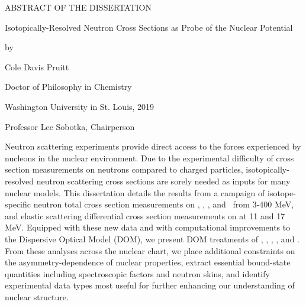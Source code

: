\thispagestyle{plain}
\begin{center}

    ABSTRACT OF THE DISSERTATION

    Isotopically-Resolved Neutron Cross Sections as Probe of the Nuclear
    Potential

    \vspace{0.5 cm}

    by

    \vspace{0.2 cm}

    Cole Davis Pruitt

    \vspace{0.2 cm}

    Doctor of Philosophy in Chemistry

    \vspace{0.2 cm}

    Washington University in St. Louis, 2019

    \vspace{0.2cm}

    Professor Lee Sobotka, Chairperson
\end{center}

\vspace{1cm}

Neutron scattering experiments provide direct access to the forces experienced by nucleons in the
nuclear environment. Due to the experimental difficulty of cross section measurements on neutrons compared to charged particles,
isotopically-resolved neutron scattering cross sections are sorely needed as inputs for many nuclear models.
This dissertation details the results from a campaign of
isotope-specific neutron total cross section measurements on \oSixEight, \niEightFour, \snTwelveFour, and \rhThree\ from
3-400 MeV, and elastic scattering differential cross section measurements on \snTwelveFour at 11 and 17 MeV. Equipped with these new data and
with computational improvements to the Dispersive Optical Model (DOM),
we present DOM treatments of \oSixEight, \caAughtEight, \niEightFour, 
\snTwelveFour, and \pbEight. From these analyses across the nuclear chart, we place additional 
constraints on the asymmetry-dependence of nuclear properties, extract essential bound-state 
quantities including spectroscopic factors and neutron skins, and identify experimental data types
most useful for further enhancing our understanding of nuclear structure.

